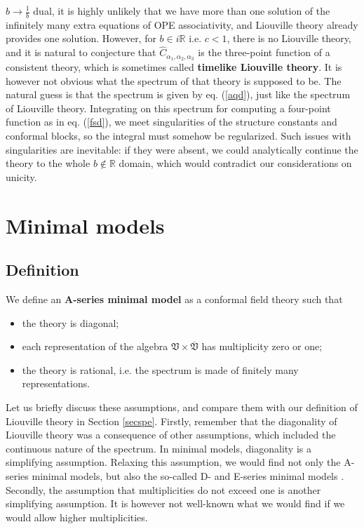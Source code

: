 \documentclass[12pt,a4paper,notitlepage]{report}
\newcommand \R {\mathbb{R}}
\numberwithin{equation}{section}
\theoremstyle{break}
\begin{document}
$b\rightarrow \frac{1}{b}$ dual, it is highly unlikely that we have more than one solution of the infinitely many extra equations of OPE associativity, and Liouville theory already provides one solution. However, for $b\in i\R$ i.e. $c<1$, there is no Liouville theory, and it is natural to conjecture that $\hat{C}_{\alpha_1,\alpha_2,\alpha_3}$ is the three-point function of a consistent theory, which is sometimes called \textbf{timelike Liouville theory}. It is however not obvious what the spectrum of that theory is supposed to be. The natural guess is that the spectrum is given by eq. (\ref{aqd}), just like the spectrum of Liouville theory. Integrating on this spectrum for computing a four-point function as in eq. (\ref{fsd}), we meet singularities of the structure constants and conformal blocks, so the integral must somehow be regularized. Such issues with singularities are inevitable: if they were absent, we could analytically continue the theory to the whole $b\notin \R$ domain, which would contradict our considerations on unicity.


\section{Minimal models \label{secvmm}}

\subsection{Definition}

We define an \textbf{A-series minimal model} as a conformal field theory such that
\begin{itemize}
 \item the theory is diagonal;
\item each representation of the algebra $\mathfrak{V}\times \overline{\mathfrak{V}}$ has multiplicity zero or one;
\item the theory is rational, i.e. the spectrum is made of finitely many representations.
\end{itemize}
Let us briefly discuss these assumptions, and compare them with our definition of Liouville theory in Section \ref{secspe}. Firstly, remember that the diagonality of Liouville theory was a consequence of other assumptions, which included the continuous nature of the spectrum. In minimal models, diagonality is a simplifying assumption. Relaxing this assumption, we would find not only the A-series minimal models, but also the so-called D- and E-series minimal models \cite{fms97}. Secondly, the assumption that multiplicities do not exceed one is another simplifying assumption. It is however not well-known what we would find if we would allow higher multiplicities. 
\end{document}
